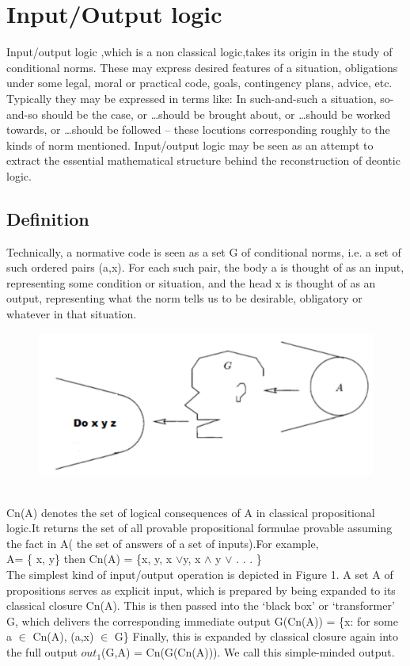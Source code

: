 \documentclass{article}
\begin{document}
\section{Input/Output logic}
Input/output logic\cite{5} ,which  is a non classical logic,takes its origin in the study of conditional norms. These may express desired features of a situation, obligations under some legal, moral or practical code, goals, contingency plans, advice, etc. Typically they may be expressed in terms like: In such-and-such a situation, so-and-so should be the case, or …should be brought about, or …should be worked towards, or …should be followed – these locutions corresponding roughly to the kinds of norm mentioned.
 Input/output logic may be seen as an attempt to extract the essential mathematical structure behind the reconstruction of deontic logic.\\
 \subsection{Definition}
   Technically, a normative code is seen as a set G of conditional norms, i.e. a set of such ordered pairs (a,x). For each such pair, the body a is thought of as an input, representing some condition or situation, and the head x is thought of as an output, representing what the norm tells us to be desirable, obligatory or whatever in that situation.
\begin{figure}[hb]
\centering
\includegraphics[scale=0.45]{input_output.png}
\label{fig_framework}
\end{figure}\\
Cn(A) denotes the set of logical consequences of A in classical propositional
logic.It returns the set of all provable propositional formulae provable assuming the fact in A( the set of answers of a set of inputs).For example,\\
A= \{ x, y\} then Cn(A) = \{x, y, x $\vee $y, x $\wedge$ y $\vee$ . . . \}\\
The simplest kind of input/output operation is depicted in Figure 1. A
set A of propositions serves as explicit input, which is prepared by being expanded to its classical closure Cn(A). This is then passed into the ‘black box’ or ‘transformer’ G, which delivers the corresponding immediate output G(Cn(A)) = \{x: for some a $\in$ Cn(A), (a,x) $\in$ G\} Finally, this is expanded by classical closure again into the full output $out_{1}$(G,A) = Cn(G(Cn(A))). We call this simple-minded output.\\
\end{document}
